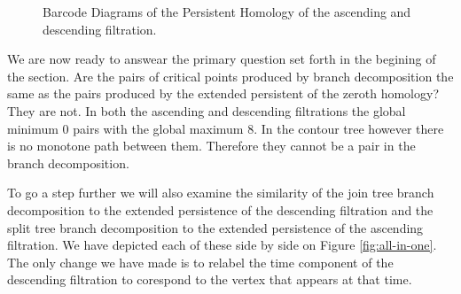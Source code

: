 \begin{figure}[h]%
    \centering
    \qquad \qquad

    \caption{Barcode Diagrams of the Persistent Homology of the ascending and descending filtration.}%
    \label{fig:barcode-asc-desc}%
\end{figure}

We are now ready to answear the primary question set forth in the begining of the section. Are the pairs of critical points produced by branch decomposition the same as the pairs produced by the extended persistent of the zeroth homology? They are not. In both the ascending and descending filtrations the global minimum $0$ pairs with the global maximum $8$. In the contour tree however there is no monotone path between them. Therefore they cannot be a pair in the branch decomposition.

To go a step further we will also examine the similarity of the join tree branch decomposition to the extended persistence of the descending filtration and the split tree branch decomposition to the extended persistence of the ascending filtration. We have depicted each of these side by side on Figure \ref{fig:all-in-one}. The only change we have made is to relabel the time component of the descending filtration to corespond to the vertex that appears at that time.


